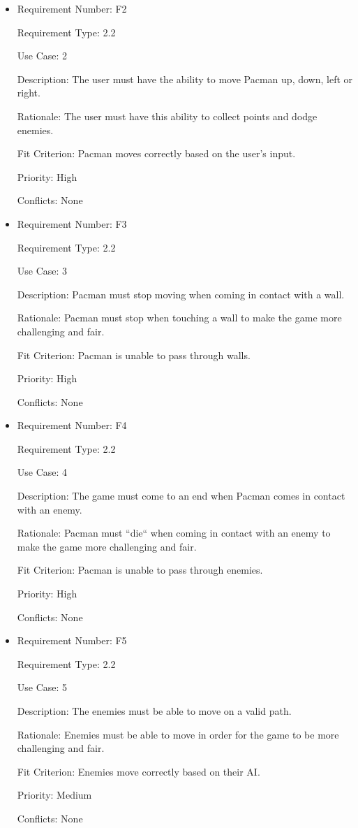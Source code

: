 \documentclass[12pt, titlepage]{article}
\begin{document}
\begin{itemize}
\item
Requirement Number: F2

Requirement Type: 2.2

Use Case: 2

Description: The user must have the ability to move Pacman up, down, left or right.

Rationale: The user must have this ability to collect points and dodge enemies.

Fit Criterion: Pacman moves correctly based on the user’s input.

Priority: High

Conflicts: None
\end{itemize}

\begin{itemize}
\item
Requirement Number: F3 

Requirement Type: 2.2

Use Case: 3

Description: Pacman must stop moving when coming in contact with a wall.

Rationale: Pacman must stop when touching a wall to make the game more challenging and fair.

Fit Criterion: Pacman is unable to pass through walls.

Priority: High

Conflicts: None
\end{itemize}

\begin{itemize}
\item
Requirement Number: F4

Requirement Type: 2.2

Use Case: 4

Description: The game must come to an end when Pacman comes in contact with an enemy.

Rationale: Pacman must ``die`` when coming in contact with an enemy to make the game more challenging and fair.

Fit Criterion: Pacman is unable to pass through enemies.

Priority: High

Conflicts: None
\end{itemize}

\begin{itemize}
\item
Requirement Number: F5

Requirement Type: 2.2

Use Case: 5

Description: The enemies must be able to move on a valid path.

Rationale: Enemies must be able to move in order for the game to be more challenging and fair.

Fit Criterion: Enemies move correctly based on their AI.

Priority: Medium

Conflicts: None
\end{itemize}
\end{document}
